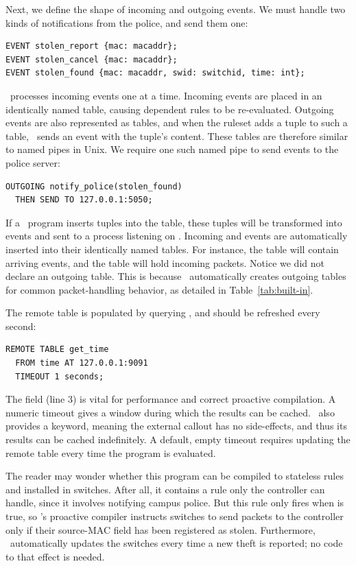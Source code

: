 Next, we define the shape of incoming and outgoing events. We must
handle two kinds of notifications from the police, and send them one:
\begin{lstlisting}[label=list:3]
EVENT stolen_report {mac: macaddr};
EVENT stolen_cancel {mac: macaddr};
EVENT stolen_found {mac: macaddr, swid: switchid, time: int};
\end{lstlisting}
\flowlog\ processes incoming events one at a time.
Incoming events are placed in an identically named table,
causing dependent rules to be re-evaluated.
Outgoing events are also represented as
tables, and when the ruleset adds a tuple to such a table, \flowlog\ sends
an event with the tuple's content. 
These tables are therefore similar to named pipes in Unix. We require one such named pipe to
send  events to the police server:
\begin{lstlisting}[label=list:4]
OUTGOING notify_police(stolen_found)
  THEN SEND TO 127.0.0.1:5050;
\end{lstlisting}
If a
\flowlog\ program inserts tuples into the 
table, these tuples will be transformed into 
events and sent to a process listening on . 
Incoming  and  events are
automatically inserted into their identically named tables. For
instance, the  table will contain arriving
 events, and the  table will hold incoming packets.
Notice we did not declare an outgoing  table. This is
because \flowlog\ automatically creates outgoing tables for common
packet-handling behavior, as detailed in Table~\ref{tab:built-in}.

The remote table  is populated by querying
, and should be refreshed every second:
\begin{lstlisting}[label=list:5]
REMOTE TABLE get_time 
  FROM time AT 127.0.0.1:9091
  TIMEOUT 1 seconds;
\end{lstlisting}
The  field (line 3) is vital for performance and correct proactive compilation. 
A numeric timeout gives a window during which the results can be cached. \flowlog\ also provides a  
keyword, meaning the external callout has no side-effects, and thus its results can
be cached indefinitely. A default, empty timeout requires updating the remote table
every time the program is evaluated. 

The reader may wonder whether this program can be compiled to stateless rules and installed in switches. After all,
it contains a rule only the controller can handle, since
it involves notifying campus police. But this rule
only fires when  is true, so \flowlog's proactive
compiler instructs switches to send packets to the controller only if their
source-MAC field has been registered as stolen. Furthermore, \flowlog\ automatically
updates the switches every time a new theft is reported; no code to that effect is needed.

